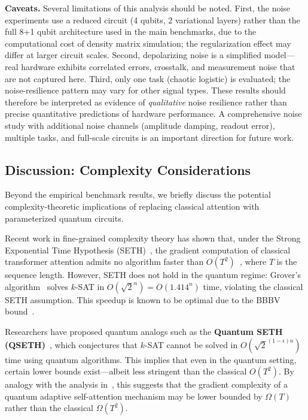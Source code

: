 \documentclass[conference]{IEEEtran}
\begin{document}
\textbf{Caveats.} Several limitations of this analysis should be noted. First, the noise experiments use a reduced circuit (4 qubits, 2 variational layers) rather than the full 8+1 qubit architecture used in the main benchmarks, due to the computational cost of density matrix simulation; the regularization effect may differ at larger circuit scales. Second, depolarizing noise is a simplified model---real hardware exhibits correlated errors, crosstalk, and measurement noise that are not captured here. Third, only one task (chaotic logistic) is evaluated; the noise-resilience pattern may vary for other signal types. These results should therefore be interpreted as evidence of \emph{qualitative} noise resilience rather than precise quantitative predictions of hardware performance. A comprehensive noise study with additional noise channels (amplitude damping, readout error), multiple tasks, and full-scale circuits is an important direction for future work.

\subsection{Discussion: Complexity Considerations}

Beyond the empirical benchmark results, we briefly discuss the potential complexity-theoretic implications of replacing classical attention with parameterized quantum circuits.

Recent work in fine-grained complexity theory has shown that, under the Strong Exponential Time Hypothesis (SETH)~\cite{ImpagliazzoPaturi2001}, the gradient computation of classical transformer attention admits no algorithm faster than $O(T^2)$~\cite{alman2024fine}, where $T$ is the sequence length. However, SETH does not hold in the quantum regime: Grover's algorithm~\cite{grover1996fast} solves $k$-SAT in $O(\sqrt{2}^n) = O(1.414^n)$ time, violating the classical SETH assumption. This speedup is known to be optimal due to the BBBV bound~\cite{bennett1997strengths}.

Researchers have proposed quantum analogs such as the \textbf{Quantum SETH (QSETH)}~\cite{buhrman2019quantum}, which conjectures that $k$-SAT cannot be solved in $O(\sqrt{2}^{(1-\epsilon)n})$ time using quantum algorithms. This implies that even in the quantum setting, certain lower bounds exist---albeit less stringent than the classical $O(T^2)$. By analogy with the analysis in~\cite{alman2024fine}, this suggests that the gradient complexity of a quantum adaptive self-attention mechanism may be lower bounded by $\Omega(T)$ rather than the classical $\Omega(T^2)$.
\end{document}
